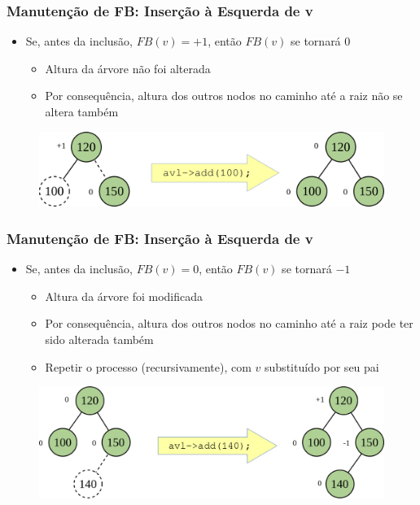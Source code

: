 \documentclass[aspectratio=169]{beamer}
\begin{document}
\begin{frame}\frametitle{Manutenção de FB: Inserção à Esquerda de v}
\begin{itemize}
	\item Se, antes da inclusão, $FB(v) = +1$, então $FB(v)$ se tornará $0$
	\begin{itemize}
		\item Altura da árvore não foi alterada
		\item Por consequência, altura dos outros nodos no caminho até a raiz não se altera também
	\end{itemize}
\end{itemize}
\begin{figure}[h]
	\centering
	\includegraphics[height=0.22\paperheight]{imagens/avl_ins_esq1.png}
\end{figure}
\end{frame}

\begin{frame}\frametitle{Manutenção de FB: Inserção à Esquerda de v}
\begin{itemize}
	\item Se, antes da inclusão, $FB(v) = 0$, então $FB(v)$ se tornará $-1$
	\begin{itemize}
		\item Altura da árvore foi modificada
		\item Por consequência, altura dos outros nodos no caminho até a raiz pode ter sido alterada também
		\item Repetir o processo (recursivamente), com $v$ substituído por seu pai
	\end{itemize}
\end{itemize}
\begin{figure}[h]
	\centering
	\includegraphics[height=0.35\paperheight]{imagens/avl_ins_esq2.png}
\end{figure}
\end{frame}
\end{document}
